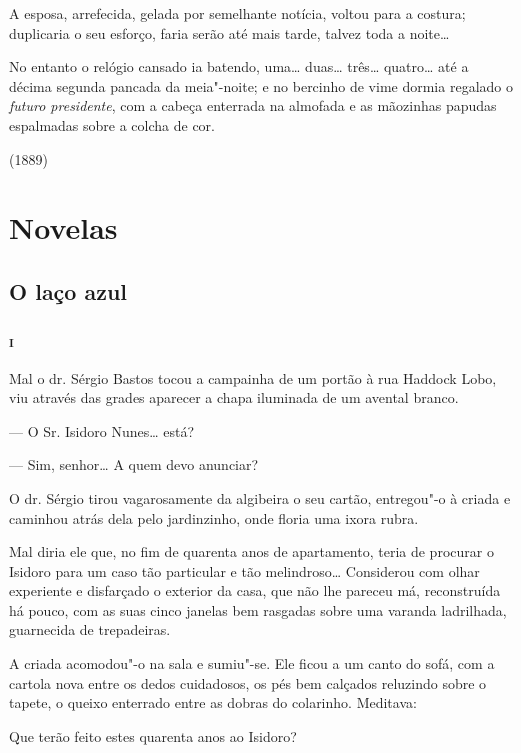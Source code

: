 A esposa, arrefecida, gelada por semelhante notícia, voltou para a
costura; duplicaria o seu esforço, faria serão até mais tarde, talvez
toda a noite\ldots{}

No entanto o relógio cansado ia batendo, uma\ldots{} duas\ldots{} três\ldots{}
quatro\ldots{} até a décima segunda pancada da meia"-noite; e no bercinho de
vime dormia regalado o \emph{futuro presidente}, com a cabeça enterrada
na almofada e as mãozinhas papudas espalmadas sobre a colcha de cor.

(1889)

\part{Novelas}

\chapter[O laço azul]{O laço azul}



\section{\textsc{i}}

Mal o dr. Sérgio Bastos tocou a campainha de um portão à rua Haddock
Lobo, viu através das grades aparecer a chapa iluminada de um avental
branco.

--- O Sr. Isidoro Nunes\ldots{} está?

--- Sim, senhor\ldots{} A quem devo anunciar?

O dr. Sérgio tirou vagarosamente da algibeira o seu cartão, entregou"-o à
criada e caminhou atrás dela pelo jardinzinho, onde floria uma ixora
rubra.

Mal diria ele que, no fim de quarenta anos de apartamento, teria de
procurar o Isidoro para um caso tão particular e tão melindroso\ldots{}
Considerou com olhar experiente e disfarçado o exterior da casa, que não
lhe pareceu má, reconstruída há pouco, com as suas cinco janelas bem
rasgadas sobre uma varanda ladrilhada, guarnecida de trepadeiras.

A criada acomodou"-o na sala e sumiu"-se. Ele ficou a um canto do sofá,
com a cartola nova entre os dedos cuidadosos, os pés bem calçados
reluzindo sobre o tapete, o queixo enterrado entre as dobras do
colarinho. Meditava:

Que terão feito estes quarenta anos ao Isidoro?

